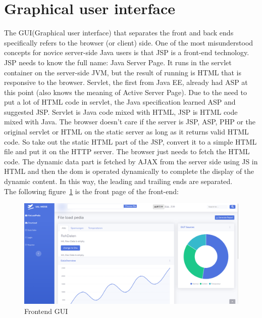\section{Graphical user interface}
\label{sec:Graphical user interface}
The GUI(Graphical user interface) that separates the front and back ends specifically refers to the browser (or client) side. One of the most misunderstood concepts for novice server-side Java users is that JSP is a front-end technology. JSP needs to know the full name: Java Server Page. It runs in the servlet container on the server-side JVM, but the result of running is HTML that is responsive to the browser. Servlet, the first from Java EE, already had ASP at this point (also knows the meaning of Active Server Page). Due to the need to put a lot of HTML code in servlet, the Java specification learned ASP and suggested JSP. Servlet is Java code mixed with HTML, JSP is HTML code mixed with Java. The browser doesn't care if the server is JSP, ASP, PHP or the original servlet or HTML on the static server as long as it returns valid HTML code. So take out the static HTML part of the JSP, convert it to a simple HTML file and put it on the HTTP server. The browser just needs to fetch the HTML code. The dynamic data part is fetched by AJAX from the server side using JS in HTML and then the dom is operated dynamically to complete the display of the dynamic content. In this way, the leading and trailing ends are separated.
\\
The following figure~\ref{fig:2.10}  is the front page of the front-end:
\begin{figure}[!ht]
	\centering
	\includegraphics[width=13cm]{grafiken/2.10.pdf}
	\caption{Frontend GUI} 
	\label{fig:2.10}
\end{figure}
\FloatBarrier

